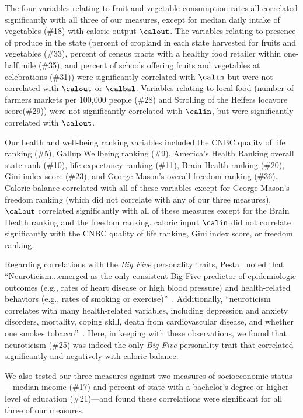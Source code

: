 The four variables relating to fruit and vegetable consumption rates
all correlated significantly with all three of our measures, except
for median daily intake of vegetables (\#18) with caloric output $\calout$.
The variables relating to presence of produce in the state (percent of
cropland in each state harvested for fruits and vegetables (\#33),
percent of census tracts with a healthy food retailer within one-half
mile (\#35), and percent of schools offering fruits and vegetables at
celebrations (\#31)) were significantly correlated with $\calin$
but were not correlated with $\calout$ or $\calbal$.
Variables relating to local food (number of farmers markets per
100,000 people (\#28) and Strolling of the Heifers locavore
score(\#29)) were not significantly correlated with $\calin$,
but were significantly correlated with $\calout$.

Our health and well-being ranking variables included 
the CNBC quality of life ranking (\#5), 
Gallup Wellbeing ranking (\#9), 
America's Health Ranking overall state rank (\#10), 
life expectancy ranking (\#11), 
Brain Health ranking (\#20), 
Gini index score (\#23), and
George Mason's overall freedom ranking (\#36).  
Caloric balance
correlated with all of these variables except for George Mason's
freedom ranking (which did not correlate with any of our three
measures).  $\calout$ correlated significantly with all of these
measures except for the Brain Health ranking and the freedom ranking.
caloric input $\calin$ did not correlate significantly with the CNBC quality
of life ranking, Gini index score, or freedom ranking.

Regarding correlations with the \textit{Big Five} personality traits,
Pesta \etal\ noted that ``Neuroticism...emerged as the only
consistent Big Five predictor of epidemiologic outcomes (e.g., rates
of heart disease or high blood pressure) and health-related behaviors
(e.g., rates of smoking or exercise)''~\cite{pesta}.  
Additionally,
``neuroticism correlates with many health-related variables, including
depression and anxiety disorders, mortality, coping skill, death from
cardiovascular disease, and whether one smokes tobacco''~\cite{pesta}.
Here, in keeping with these observations, we found that neuroticism
(\#25) was 
indeed the only \textit{Big Five}
personality trait that correlated significantly and negatively 
with caloric balance.

We also tested our three measures against two measures of
socioeconomic status---median income (\#17) and percent of state with a
bachelor's degree or higher level of education (\#21)---and found
these correlations were significant for all three of our measures.

